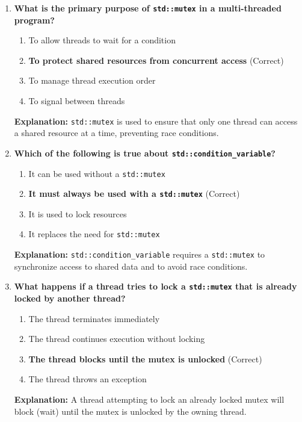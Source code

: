 \documentclass[12pt]{article}
\begin{document}
\begin{enumerate}
    \item \textbf{What is the primary purpose of \texttt{std::mutex} in a multi-threaded program?}
    \begin{enumerate}[label=(\alph*)]
        \item To allow threads to wait for a condition
        \item \textbf{To protect shared resources from concurrent access} (Correct)
        \item To manage thread execution order
        \item To signal between threads
    \end{enumerate}
    \textbf{Explanation:} \texttt{std::mutex} is used to ensure that only one thread can access a shared resource at a time, preventing race conditions.

    \item \textbf{Which of the following is true about \texttt{std::condition\_variable}?}
    \begin{enumerate}[label=(\alph*)]
        \item It can be used without a \texttt{std::mutex}
        \item \textbf{It must always be used with a \texttt{std::mutex}} (Correct)
        \item It is used to lock resources
        \item It replaces the need for \texttt{std::mutex}
    \end{enumerate}
    \textbf{Explanation:} \texttt{std::condition\_variable} requires a \texttt{std::mutex} to synchronize access to shared data and to avoid race conditions.

    \item \textbf{What happens if a thread tries to lock a \texttt{std::mutex} that is already locked by another thread?}
    \begin{enumerate}[label=(\alph*)]
        \item The thread terminates immediately
        \item The thread continues execution without locking
        \item \textbf{The thread blocks until the mutex is unlocked} (Correct)
        \item The thread throws an exception
    \end{enumerate}
    \textbf{Explanation:} A thread attempting to lock an already locked mutex will block (wait) until the mutex is unlocked by the owning thread.


\end{enumerate}
\end{document}
